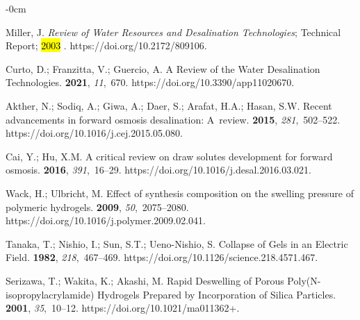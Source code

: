 \documentclass[gels,article,accept,pdftex,moreauthors]{Definitions/mdpi}
\begin{document}
\begin{adjustwidth}{-\extralength}{0cm}
\begin{thebibliography}{999}
Miller, J.
\newblock \emph{Review of Water Resources and Desalination Technologies};
\newblock Technical Report;  \hl{2003}%
.
\newblock
  https://doi.org/10.2172/809106.%

Curto, D.; Franzitta, V.; Guercio, A.
\newblock A Review of the Water Desalination Technologies.
 {\bf 2021}, {\em 11},~670.
\newblock
  https://doi.org/10.3390/app11020670.%

Akther, N.; Sodiq, A.; Giwa, A.; Daer, S.; Arafat, H.A.; Hasan, S.W.
\newblock Recent advancements in forward osmosis desalination: A~review.
 {\bf 2015}, {\em 281},~502--522.
\newblock
  https://doi.org/10.1016/j.cej.2015.05.080.%

Cai, Y.; Hu, X.M.
\newblock A critical review on draw solutes development for forward osmosis.
 {\bf 2016}, {\em 391},~16--29.
\newblock
  https://doi.org/10.1016/j.desal.2016.03.021.%

Wack, H.; Ulbricht, M.
\newblock Effect of synthesis composition on the swelling pressure of polymeric
  hydrogels.
 {\bf 2009}, {\em 50},~2075--2080.
\newblock
  https://doi.org/10.1016/j.polymer.2009.02.041.%

Tanaka, T.; Nishio, I.; Sun, S.T.; Ueno-Nishio, S.
\newblock Collapse of Gels in an Electric Field.
 {\bf 1982}, {\em 218},~467--469.
\newblock
  https://doi.org/10.1126/science.218.4571.467.%

Serizawa, T.; Wakita, K.; Akashi, M.
\newblock Rapid Deswelling of Porous Poly(N-isopropylacrylamide) Hydrogels
  Prepared by Incorporation of Silica Particles.
 {\bf 2001}, {\em 35},~10--12.
\newblock
  https://doi.org/10.1021/ma011362+.%


\end{thebibliography}
\end{adjustwidth}
\end{document}

